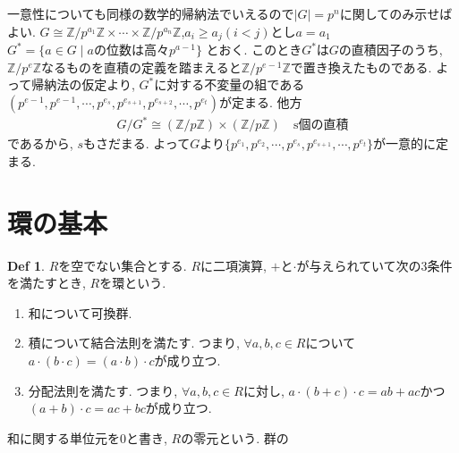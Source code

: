\documentclass[dvipdfmx]{jsarticle}
\theoremstyle{definition}
\newtheorem{definition}{Def}
\numberwithin{equation}{section}
\numberwithin{props}{section}
\numberwithin{definition}{section}
\numberwithin{note}{section}
\newcommand{\ZZ}{\mathbb{Z}}
\begin{document}
一意性についても同様の数学的帰納法でいえるので$\lvert G\rvert=p^n$に関してのみ示せばよい.
$G\cong\ZZ/p^{a_1}\ZZ\times\cdots\times\ZZ/p^{a_n}\ZZ$,$a_i \geq a_j (i<j)$とし$a=a_1$
$G^* = \lbrace a\in G\mid aの位数は高々 p^{a-1}\rbrace$
とおく. このとき$G^*$は$G$の直積因子のうち, $\ZZ/p^e\ZZ$なるものを直積の定義を踏まえると$\ZZ/p^{e-1}\ZZ$で置き換えたものである. よって帰納法の仮定より, $G^*$に対する不変量の組である$( p^{e-1},p^{e-1},\cdots,p^{e_s},p^{e_{s+1}},p^{e_{s+2}},\cdots,p^{e_t})$が定まる. 他方
\begin{align}
     G/G^*\cong (\ZZ/p\ZZ)\times (\ZZ/p\ZZ)\quad \mathrm{s個の直積}
\end{align}
であるから, $s$もさだまる. よって$G$より$\lbrace p^{e_1},p^{e_2},\cdots,p^{e_s},p^{e_{s+1}},\cdots,p^{e_t}\rbrace$が一意的に定まる.
\section{環の基本}
\begin{definition}
     $R$を空でない集合とする. $R$に二項演算, $+$と$\cdot$が与えられていて次の3条件を満たすとき, $R$を環という.
     \begin{enumerate}
          \item 和について可換群.
          \item 積について結合法則を満たす. つまり, $\forall a,b,c\in R$について$a\cdot (b\cdot c)=(a\cdot b)\cdot c$が成り立つ.
          \item 分配法則を満たす. つまり, $\forall a,b,c\in R$に対し, $a\cdot (b+c)\cdot c = ab+ac$かつ$(a+b)\cdot c=ac+bc$が成り立つ.
     \end{enumerate}
     和に関する単位元を0と書き, $R$の零元という. 群の
\end{definition}
\end{document}
